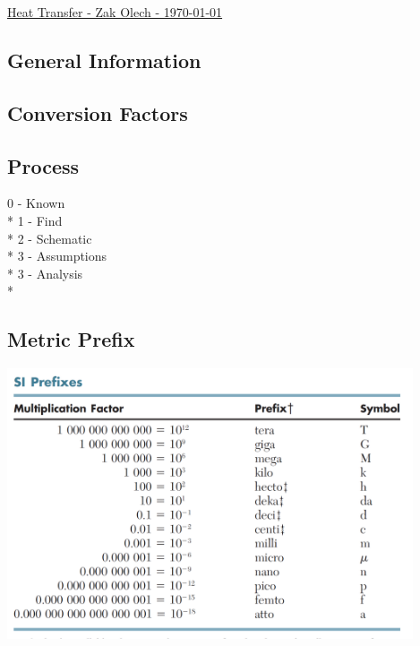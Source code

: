 \documentclass[10pt,landscape]{article}
\newenvironment{Figure}
     {\par\medskip\noindent\minipage{\linewidth}}
     {\endminipage\par\medskip}
\begin{document}
\raggedright
\footnotesize


\begin{center}
     \Large{\underline{Heat Transfer - Zak Olech - \today}}
\end{center}
\begin{multicols}{3}

\setlength{\columnseprule}{0.25pt}
\setlength{\premulticols}{1pt}
\setlength{\postmulticols}{1pt}
\setlength{\multicolsep}{1pt}
\setlength{\columnsep}{2pt}


\section{General Information}
\subsection{Conversion Factors}

\subsection{Process}
0 - Known\\*
1 - Find\\*
2 - Schematic\\*
3 - Assumptions\\*
3 - Analysis\\*
\subsection{Metric Prefix}
\begin{Figure}
    \centering
    \includegraphics[width=\linewidth, height=8cm]{SI_Prefix.png}
\end{Figure}


\end{multicols}
\end{document}
